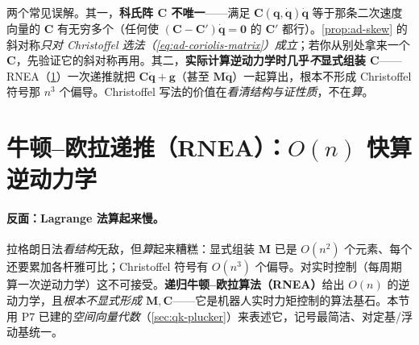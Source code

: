 \begin{pitfall}
\label{pit:ad-coriolis-unique}
两个常见误解。其一，\textbf{科氏阵 $\mathbf{C}$ 不唯一}——满足 $\mathbf{C}(\mathbf{q},\dot{\mathbf{q}})\dot{\mathbf{q}}$ 等于那条二次速度向量的 $\mathbf{C}$ 有无穷多个（任何使 $(\mathbf{C}-\mathbf{C}')\dot{\mathbf{q}}=\mathbf{0}$ 的 $\mathbf{C}'$ 都行）。\cref{prop:ad-skew} 的斜对称\emph{只对 Christoffel 选法（\cref{eq:ad-coriolis-matrix}）成立}；若你从别处拿来一个 $\mathbf{C}$，先验证它的斜对称再用。其二，\textbf{实际计算逆动力学时几乎\emph{不}显式组装 $\mathbf{C}$}——RNEA（\cref{sec:ad-rnea}）一次递推就把 $\mathbf{C}\dot{\mathbf{q}}+\mathbf{g}$（甚至 $\mathbf{M}\ddot{\mathbf{q}}$）一起算出，根本不形成 Christoffel 符号那 $n^3$ 个偏导。Christoffel 写法的价值在\emph{看清结构与证性质}，不在\emph{算}。
\end{pitfall}

\section{牛顿--欧拉递推（RNEA）：\texorpdfstring{$O(n)$}{O(n)} 快算逆动力学}
\label{sec:ad-rnea}

\paragraph{反面：Lagrange 法算起来慢。}
拉格朗日法\emph{看结构}无敌，但\emph{算}起来糟糕：显式组装 $\mathbf{M}$ 已是 $O(n^2)$ 个元素、每个还要累加各杆雅可比；Christoffel 符号有 $O(n^3)$ 个偏导。对实时控制（每周期算一次逆动力学）这不可接受。\textbf{递归牛顿--欧拉算法（RNEA）}给出 $O(n)$ 的逆动力学，且\emph{根本不显式形成 $\mathbf{M},\mathbf{C}$}——它是机器人实时力矩控制的算法基石\cite{featherstone2008rbda}。本节用 P7 已建的\emph{空间向量代数}（\cref{sec:qk-plucker}）来表述它，记号最简洁、对定基/浮动基统一。

